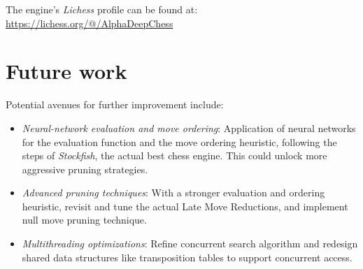 \vspace{1em}

\noindent The engine's \textit{Lichess} profile can be found at:\\
\url{https://lichess.org/@/AlphaDeepChess}


\newpage
\section{Future work}

\noindent Potential avenues for further improvement include:

\begin{itemize}[itemsep=1pt]
    \item \textit{Neural-network evaluation and move ordering}:  
    Application of neural networks for the evaluation function and the move ordering heuristic, following the steps of \textit{Stockfish}, the actual best chess engine. This could unlock more aggressive pruning strategies.
    \item \textit{Advanced pruning techniques}:  
    With a stronger evaluation and ordering heuristic, revisit and tune the actual Late Move Reductions, and implement null move pruning technique.
    \item \textit{Multithreading optimizations}:  
    Refine concurrent search algorithm and redesign shared data structures like transposition tables to support concurrent access.
\end{itemize}
